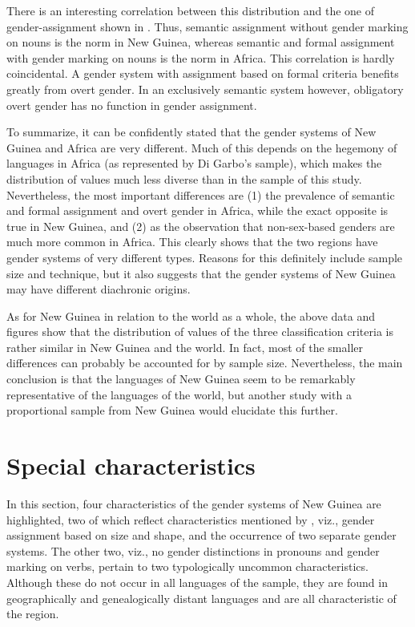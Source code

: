 \documentclass[output=collectionpaper]{langsci/langscibook}
\begin{document}
There is an interesting correlation between this distribution and the one of gender-assignment shown in . Thus, semantic assignment without gender marking on nouns is the norm in New Guinea, whereas semantic and formal assignment with gender marking on nouns is the norm in Africa. This correlation is hardly coincidental. A gender system with assignment based on formal criteria benefits greatly from overt gender. In an exclusively semantic system however, obligatory overt gender has no function in gender assignment.

To summarize, it can be confidently stated that the gender systems of New Guinea and Africa are very different. Much of this depends on the hegemony of  languages in Africa (as represented by Di Garbo's sample), which makes the distribution of values much less diverse than in the sample of this study. Nevertheless, the most important differences are (1) the prevalence of semantic and formal assignment and overt gender in Africa, while the exact opposite is true in New Guinea, and (2) as the observation that non-sex-based genders are much more common in Africa. This clearly shows that the two regions have gender systems of very different types. Reasons for this definitely include sample size and technique, but it also suggests that the gender systems of New Guinea may have different diachronic origins.

As for New Guinea in relation to the world as a whole, the above data and figures show that the distribution of values of the three classification criteria is rather similar in New Guinea and the world. In fact, most of the smaller differences can probably be accounted for by sample size. Nevertheless, the main conclusion is that the languages of New Guinea seem to be remarkably representative of the languages of the world, but another study with a proportional sample from New Guinea would elucidate this further.

\section{Special characteristics}

In this section, four characteristics of the gender systems of New Guinea are highlighted, two of which reflect characteristics mentioned by \citet{Foley2000}, viz., gender assignment based on size and shape, and the occurrence of two separate gender systems. The other two, viz., no gender distinctions in pronouns and gender marking on verbs, pertain to two typologically uncommon characteristics.  Although these do not occur in all languages of the sample, they are found in geographically and genealogically distant languages and are all characteristic of the region.
\end{document}
